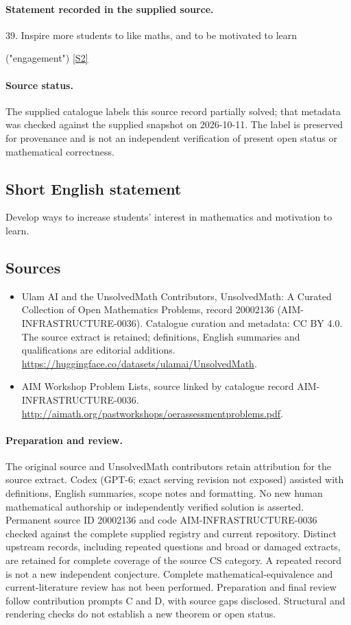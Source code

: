 \documentclass[11pt]{article}
\newcommand{\sref}[2]{\hyperlink{source:#1:#2}{[S#2]}}
\begin{document}
\paragraph{Statement recorded in the supplied source.}
39. Inspire more students to like maths, and to be motivated to learn

("engagement") \sref{20002136}{2}
\paragraph{Source status.}
The supplied catalogue labels this source record partially solved; that metadata was checked against the supplied snapshot on 2026-10-11. The label is preserved for provenance and is not an independent verification of present open status or mathematical correctness.
\subsection{Short English statement}
Develop ways to increase students' interest in mathematics and motivation to learn.
\subsection{Sources}
\begin{itemize}
\item[\hypertarget{source:20002136:1}{S1}] Ulam AI and the UnsolvedMath Contributors, UnsolvedMath: A Curated Collection of Open Mathematics Problems, record 20002136 (AIM-INFRASTRUCTURE-0036). Catalogue curation and metadata: CC BY 4.0. The source extract is retained; definitions, English summaries and qualifications are editorial additions.
\url{https://huggingface.co/datasets/ulamai/UnsolvedMath}.
\item[\hypertarget{source:20002136:2}{S2}] AIM Workshop Problem Lists, source linked by catalogue record AIM-INFRASTRUCTURE-0036.
\url{http://aimath.org/pastworkshops/oerassessmentproblems.pdf}.
\end{itemize}
\paragraph{Preparation and review.}
The original source and UnsolvedMath contributors retain attribution for the source extract. Codex (GPT-6; exact serving revision not exposed) assisted with definitions, English summaries, scope notes and formatting. No new human mathematical authorship or independently verified solution is asserted. Permanent source ID 20002136 and code AIM-INFRASTRUCTURE-0036 checked against the complete supplied registry and current repository. Distinct upstream records, including repeated questions and broad or damaged extracts, are retained for complete coverage of the source CS category. A repeated record is not a new independent conjecture. Complete mathematical-equivalence and current-literature review has not been performed. Preparation and final review follow contribution prompts C and D, with source gaps disclosed. Structural and rendering checks do not establish a new theorem or open status.
\label{end:20002136}
\end{document}
